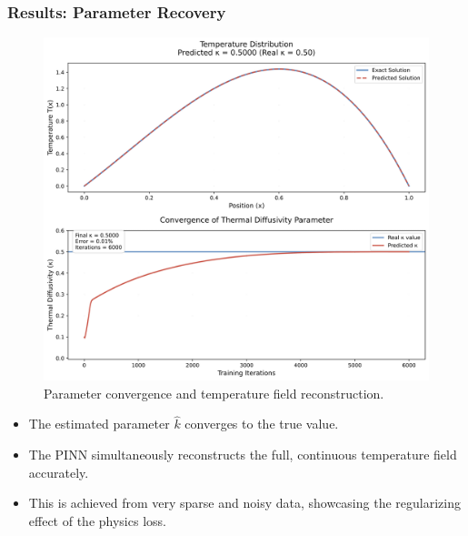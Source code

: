 \documentclass[notes]{beamer}
\begin{document}
\begin{frame}
\frametitle{Results: Parameter Recovery}

\begin{minipage}[t]{0.48\textwidth}
\begin{figure}[ht]
	\centering
	\includegraphics[width=\linewidth]{figs/inverse-heat-diffusivity.png}
	\caption*{Parameter convergence and temperature field reconstruction.}
\end{figure}
\end{minipage}
\hfill
\begin{minipage}[t]{0.48\textwidth}
\begin{itemize}
    \item The estimated parameter $\hat{k}$ converges to the true value.
    \item The PINN simultaneously reconstructs the full, continuous temperature field accurately.
    \item This is achieved from very sparse and noisy data, showcasing the regularizing effect of the physics loss.
\end{itemize}
\end{minipage}

\end{frame}
\end{document}

